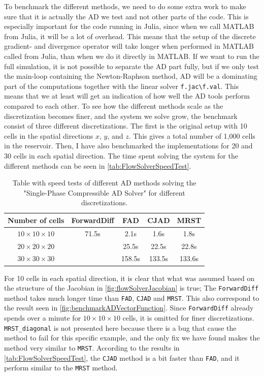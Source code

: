 To benchmark the different methods, we need to do some extra work to make sure that it is actually the AD we test and not other parts of the code. This is especially important for the code running in Julia, since when we call MATLAB from Julia, it will be a lot of overhead. This means that the setup of the discrete gradient- and divergence operator will take longer when performed in MATLAB called from Julia, than when we do it directly in MATLAB. If we want to run the full simulation, it is not possible to separate the AD part fully, but if we only test the main-loop containing the Newton-Raphson method, AD will be a dominating part of the computations together with the linear solver \texttt{f.jac\textbackslash f.val}. This means that we at least will get an indication of how well the AD tools perform compared to each other. To see how the different methods scale as the discretization becomes finer, and the system we solve grow, the benchmark consist of three different discretizations. The first is the original setup with 10 cells in the spatial directions $x$, $y$, and $z$. This gives a total number of 1,000 cells in the reservoir. Then, I have also benchmarked the implementations for 20 and 30 cells in each spatial direction. The time spent solving the system for the different methods can be seen in \autoref{tab:FlowSolverSpeedTest}.
\begin{table}[H]
    \centering
    \caption{Table with speed tests of different AD methods solving the "Single-Phase Compressible AD Solver" for different discretizations.}
    \label{tab:FlowSolverSpeedTest}
    \def\arraystretch{1.5}
    \begin{tabular}{ccccc}
    \textbf{Number of cells} & \textbf{ForwardDiff} & \textbf{FAD} & \textbf{CJAD} & \textbf{MRST}\\
        \hline
         $10\times10\times10$ & 71.5s & 2.1s & 1.6s & 1.8s  \\  
         $20\times20\times20$ & ~ & 25.5s & 22.5s & 22.8s \\ 
         $30\times30\times30$ & ~ & 158.5s & 133.5s & 133.6s \\ \hline
    \end{tabular}
\end{table}
For 10 cells in each spatial direction, it is clear that what was assumed based on the structure of the Jacobian in \autoref{fig:flowSolverJacobian} is true; The  \texttt{ForwardDiff} method takes much longer time than  \texttt{FAD}, \texttt{CJAD} and \texttt{MRST}. This also correspond to the result seen in \autoref{fig:benchmarkADVectorFunction}. Since \texttt{ForwardDiff} already spends over a minute for $10\times 10\times 10$ cells, it is omitted for finer discretizations. \texttt{MRST\_diagonal} is not presented here because there is a bug that cause the method to fail for this specific example, and the only fix we have found makes the method very similar to \texttt{MRST}. According to the results in \autoref{tab:FlowSolverSpeedTest}, the \texttt{CJAD} method is a bit faster than  \texttt{FAD}, and it perform similar to the \texttt{MRST} method. 

